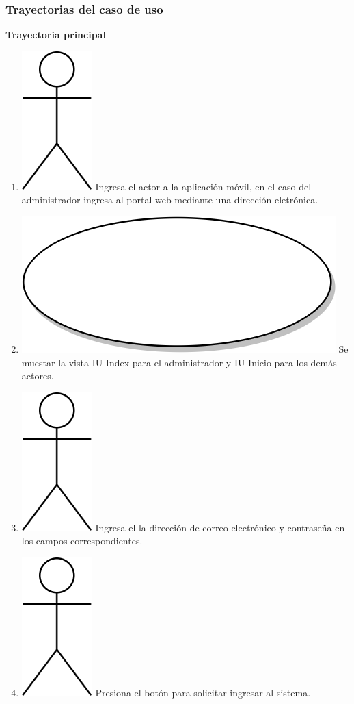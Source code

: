 \subsubsection{Trayectorias del caso de uso}
\textbf{Trayectoria principal}
\begin{enumerate}
  \item {\includegraphics[scale=.1]{Capitulo3/img/actor.png} Ingresa el actor a la aplicación móvil, en el caso del administrador ingresa al portal web mediante una dirección eletrónica.}
  \item {\includegraphics[scale=.05]{Capitulo3/img/proceso.png} Se muestar la vista IU Index para el administrador y IU Inicio para los demás actores.}
  \item {\includegraphics[scale=.1]{Capitulo3/img/actor.png} Ingresa el la dirección de correo electrónico y contraseña en los campos correspondientes.}
  \item {\includegraphics[scale=.1]{Capitulo3/img/actor.png} Presiona el botón para solicitar ingresar al sistema.}

\end{enumerate}
